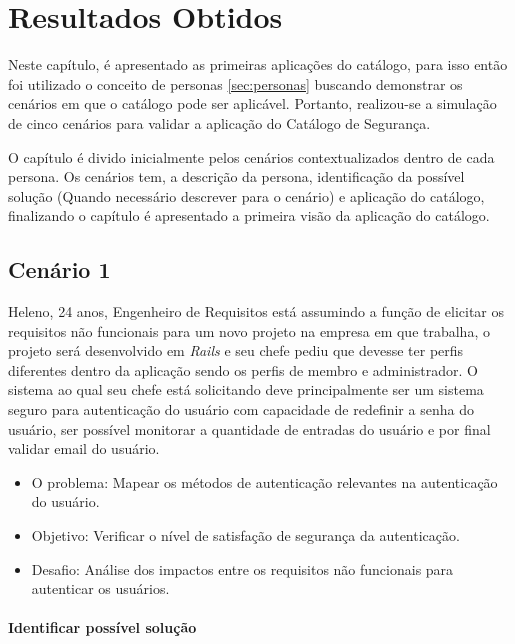 \chapter{Resultados Obtidos}
\label{chap:resultadosObtidos}

Neste capítulo, é apresentado as primeiras aplicações do catálogo, para isso então foi utilizado o conceito de personas \ref{sec:personas} buscando demonstrar os cenários em que o catálogo pode ser aplicável. Portanto, realizou-se a simulação de cinco cenários para validar a aplicação do Catálogo de Segurança. 

O capítulo é divido inicialmente pelos cenários contextualizados dentro de cada persona. Os cenários tem, a descrição da persona, identificação da possível solução (Quando necessário descrever para o cenário) e aplicação do catálogo, finalizando o capítulo é apresentado a primeira visão da aplicação do catálogo.  


\section{Cenário 1}
\label{subsec:persona1}

Heleno, 24 anos, Engenheiro de Requisitos está assumindo a função de elicitar os requisitos não funcionais para um novo projeto na empresa em que trabalha, o projeto será desenvolvido em \textit{Rails} e seu chefe pediu que devesse ter perfis diferentes dentro da aplicação sendo os perfis de membro e administrador. O sistema ao qual seu chefe está solicitando deve principalmente ser um sistema seguro para autenticação do usuário com capacidade de redefinir a senha do usuário, ser possível monitorar a quantidade de entradas do usuário e por final validar email do usuário.

\begin{itemize}
	\item O problema: Mapear os métodos de autenticação relevantes na autenticação do usuário. 
	\item Objetivo: Verificar o nível de satisfação de segurança da autenticação. 
	\item Desafio: Análise dos impactos entre os requisitos não funcionais para autenticar os usuários.
\end{itemize}


\subsubsection{Identificar possível solução}

